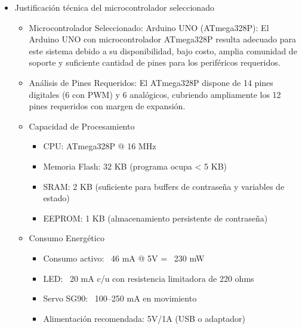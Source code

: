\begin{itemize}

    \item Justificación técnica del microcontrolador seleccionado

        \begin{itemize}

             \item Microcontrolador Seleccionado: Arduino UNO (ATmega328P): El Arduino UNO con microcontrolador ATmega328P resulta adecuado para este sistema debido a su disponibilidad, bajo costo, amplia comunidad de soporte y suficiente cantidad de pines para los periféricos requeridos\cite{Arduino_datasheet}.

             \item Análisis de Pines Requeridos:
              El ATmega328P dispone de 14 pines digitales (6 con PWM) y 6 analógicos, cubriendo ampliamente los 12 pines requeridos con margen de expansión.
              
                 

             \item Capacidad de Procesamiento

                 \begin{itemize}
                 
                       \item CPU: ATmega328P @ 16 MHz
                       \item Memoria Flash: 32 KB (programa ocupa < 5 KB)
                       \item SRAM: 2 KB (suficiente para buffers de contraseña y variables de estado)
                       \item EEPROM: 1 KB (almacenamiento persistente de contraseña) 
                       
                 \end{itemize}

             \item Consumo Energético

                  \begin{itemize}
                 
                       \item Consumo activo: ~46 mA @ 5V = ~230 mW
                       \item LED: ~20 mA c/u con resistencia limitadora de 220 ohms
                       \item Servo SG90: ~100–250 mA en movimiento
                       \item Alimentación recomendada: 5V/1A (USB o adaptador)
                       

\end{itemize}
\end{itemize}
\end{itemize}
